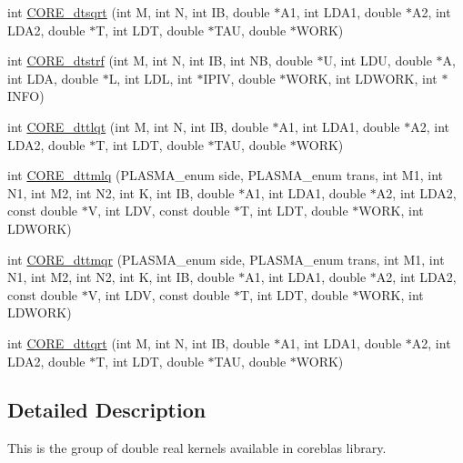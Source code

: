 \begin{DoxyCompactItemize}
\item 
int \hyperlink{group__CORE__double_ga6e39a0a7ef341418aa3cc2056f447b2c_ga6e39a0a7ef341418aa3cc2056f447b2c}{C\+O\+R\+E\+\_\+dtsqrt} (int M, int N, int I\+B, double $\ast$A1, int L\+D\+A1, double $\ast$A2, int L\+D\+A2, double $\ast$T, int L\+D\+T, double $\ast$T\+A\+U, double $\ast$W\+O\+R\+K)
\item 
int \hyperlink{group__CORE__double_ga19d4b2953d6e1f639990267b2b68fcc9_ga19d4b2953d6e1f639990267b2b68fcc9}{C\+O\+R\+E\+\_\+dtstrf} (int M, int N, int I\+B, int N\+B, double $\ast$U, int L\+D\+U, double $\ast$A, int L\+D\+A, double $\ast$L, int L\+D\+L, int $\ast$I\+P\+I\+V, double $\ast$W\+O\+R\+K, int L\+D\+W\+O\+R\+K, int $\ast$I\+N\+F\+O)
\item 
int \hyperlink{group__CORE__double_ga4016fab866fa44b3f0926b1a99e06348_ga4016fab866fa44b3f0926b1a99e06348}{C\+O\+R\+E\+\_\+dttlqt} (int M, int N, int I\+B, double $\ast$A1, int L\+D\+A1, double $\ast$A2, int L\+D\+A2, double $\ast$T, int L\+D\+T, double $\ast$T\+A\+U, double $\ast$W\+O\+R\+K)
\item 
int \hyperlink{group__CORE__double_gaa5facd81cc090e201d164e9802e5b5a3_gaa5facd81cc090e201d164e9802e5b5a3}{C\+O\+R\+E\+\_\+dttmlq} (P\+L\+A\+S\+M\+A\+\_\+enum side, P\+L\+A\+S\+M\+A\+\_\+enum trans, int M1, int N1, int M2, int N2, int K, int I\+B, double $\ast$A1, int L\+D\+A1, double $\ast$A2, int L\+D\+A2, const double $\ast$V, int L\+D\+V, const double $\ast$T, int L\+D\+T, double $\ast$W\+O\+R\+K, int L\+D\+W\+O\+R\+K)
\item 
int \hyperlink{group__CORE__double_ga5ff20296ac5424b6a431f514771bac87_ga5ff20296ac5424b6a431f514771bac87}{C\+O\+R\+E\+\_\+dttmqr} (P\+L\+A\+S\+M\+A\+\_\+enum side, P\+L\+A\+S\+M\+A\+\_\+enum trans, int M1, int N1, int M2, int N2, int K, int I\+B, double $\ast$A1, int L\+D\+A1, double $\ast$A2, int L\+D\+A2, const double $\ast$V, int L\+D\+V, const double $\ast$T, int L\+D\+T, double $\ast$W\+O\+R\+K, int L\+D\+W\+O\+R\+K)
\item 
int \hyperlink{group__CORE__double_ga28849d5bca87c3e7f82a32f838c32588_ga28849d5bca87c3e7f82a32f838c32588}{C\+O\+R\+E\+\_\+dttqrt} (int M, int N, int I\+B, double $\ast$A1, int L\+D\+A1, double $\ast$A2, int L\+D\+A2, double $\ast$T, int L\+D\+T, double $\ast$T\+A\+U, double $\ast$W\+O\+R\+K)
\end{DoxyCompactItemize}


\subsection{Detailed Description}
This is the group of double real kernels available in coreblas library. 

